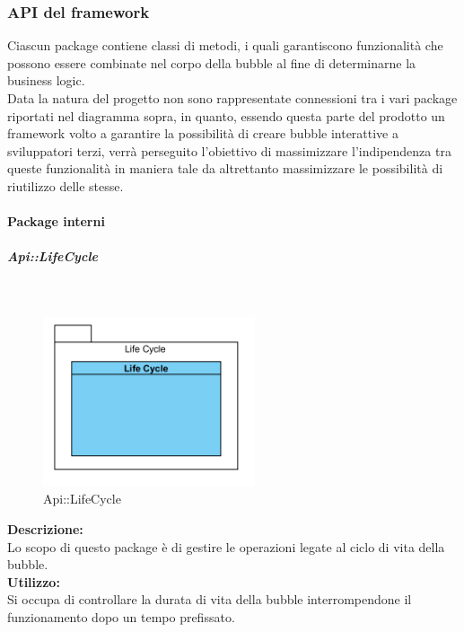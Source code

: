 \subsubsection{API del framework}
Ciascun package contiene classi di metodi, i quali garantiscono funzionalità che possono essere combinate nel corpo della bubble al fine di determinarne la business logic.\\
Data la natura del progetto non sono rappresentate connessioni tra i vari package riportati nel diagramma sopra, in quanto, essendo questa parte del prodotto un framework volto a garantire la possibilità di creare bubble interattive a sviluppatori terzi, verrà perseguito l'obiettivo di massimizzare l'indipendenza tra queste funzionalità in maniera tale da altrettanto massimizzare le possibilità di riutilizzo delle stesse.

\paragraph{Package interni}\mbox{}

\begin{samepage}
\subparagraph{Api\-::Life\-Cycle}\label{api-ciclovita}\mbox{}\\
\nopagebreak
\begin{figure}[H]
	\centering
	\includegraphics[height=5cm]{diagrammi_img/classi_e_package/api_vitabolla.png}
	\caption{Api\-::Life\-Cycle}
\end{figure}
\end{samepage}
\textbf{Descrizione:}\\ 
Lo scopo di questo package è di gestire le operazioni legate al ciclo di vita della bubble.\\
\textbf{Utilizzo:}\\
Si occupa di controllare la durata di vita della bubble interrompendone il funzionamento dopo un tempo prefissato.\\

